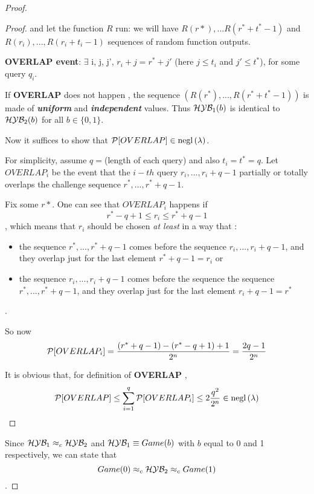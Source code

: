 \begin{proof}
\begin{proof}
        and let the function $R$ run: we will have $R(r*), ...R(r^{*}+t^{*}-1)$ and $R(r_{i}), ..., R(r_{i}+t_{i}-1)$ sequences of random function outputs.

 \begin{definition}
     \textbf{OVERLAP event}: $\exists$ i, j, j', $r_{i} + j=r^{*} + j'$ (here $j \leq t_{i}$ and $j' \leq t^{*}$), for some query $q_{i}$.
 \end{definition}
 
 If \textbf{OVERLAP}  does not happen , the sequence $(R(r^{*}), ..., R(r^{*}+t^{*}-1))$ is made of \textbf{ \textit{uniform} } and \textbf{ \textit{independent}} values.
 Thus $\H\Y\B_{1}(b)$ is identical to $\H\Y\B_{2}(b)$ for all $b \in \{0,1\}$.

 Now it suffices to show that $ \P [ OVERLAP ] \in \negl{\lambda}  $.

 For simplicity, assume $q=$(length of each query) and also $t_{i}=t^{*}=q$.
Let $OVERLAP_{i}$ be the event that the $i-th$ query $r_{i}, ..., r_{i} + q - 1 $ partially or totally overlaps the challenge sequence $r^{*}, ..., r^{*} + q - 1 $.

Fix some $r*$. One can see that $OVERLAP_{i}$ happens if 
\[
r^{*}-q+1 \leq r_{i} \leq r^{*} + q - 1
\]
, which means that $r_{i}$ should be chosen \textit{at least} in a way that :
\begin{itemize}
    \item the sequence $r^{*}, ..., r^{*} + q - 1 $ comes before the sequence $r_{i},
        ..., r_{i} + q - 1 $, and they overlap just for the last element  $r^{*}
        + q -1 = r_{i}$ or
    \item the sequence $r_{i},..., r_{i} + q - 1 $ comes before the sequence the
        sequence $r^{*}, ..., r^{*} + q - 1 $, and they overlap just for the
        last element $r_{i} + q - 1 = r^{*}$
\end{itemize}.

So now
\[
    \P [ OVERLAP_{i} ] = \frac{(r^{*} +q - 1) - (r^{*}-q+1) + 1}{2^{n}} =
    \frac{2q-1}{2^{n}}
\]

It is obvious that, for definition of \textbf{OVERLAP} , 
\[
    \P [ OVERLAP ] \leq \sum_{i=1}^{q} \P [ OVERLAP_{i} ] \leq 2
    \frac{q^{2}}{2^{n}} \in \negl{\lambda}  
\]


    \end{proof}
    
    Since $\H\Y\B_{1} \approx_{c} \H\Y\B_{2}$ and $\H\Y\B_{1}\equiv Game(b)$
    with $b$ equal to 0 and 1 respectively, we can state that 
    \[
        Game(0) \approx_{c} \H\Y\B_{2} \approx_{c} Game(1)
    \]
    .
    
\end{proof}


